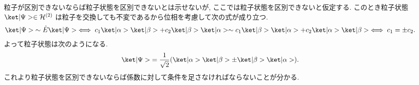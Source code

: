 \documentclass[uplatex,dvipdfmx,a4paper,11pt]{jlreq}
\newcommand{\HH}{\mathcal{H}}
\numberwithin{equation}{section}
\theoremstyle{definition}
\begin{document}
\begin{problem}[Q21-1(i)]
粒子が区別できないならば粒子状態を区別できないとは示せないが, ここでは粒子状態を区別できないと仮定する. このとき粒子状態 $\ket|\Psi>\in\HH^{(2)}$ は粒子を交換しても不変であるから位相を考慮して次の式が成り立つ.
\begin{align}
  \ket|\Psi> & \sim \hat{E}\ket|\Psi> \iff c_1\ket|\alpha>\ket|\beta> + c_2\ket|\beta>\ket|\alpha> \sim c_1\ket|\beta>\ket|\alpha> + c_2\ket|\alpha>\ket|\beta> \iff c_1 = \pm c_2.
\end{align}
よって粒子状態は次のようになる.
\begin{align}
  \ket|\Psi> & = \frac{1}{\sqrt{2}}(\ket|\alpha>\ket|\beta> \pm \ket|\beta>\ket|\alpha>).
\end{align}
これより粒子状態を区別できないならば係数に対して条件を足さなければならないことが分かる.
\label{Q21-1(i)}
\end{problem}
\end{document}
